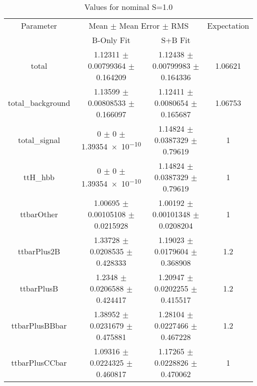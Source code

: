 \begin{table}
\centering
\caption{Values for nominal S=1.0}
\begin{tabular}{cccc}
\toprule
Parameter & \multicolumn{2}{c}{Mean $\pm$ Mean Error $\pm$ RMS} & Expectation\\
 & B-Only Fit & S+B Fit & \\
\midrule
total & \num{1.12311} $\pm$ \num{0.00799364} $\pm$ \num{0.164209} & \num{1.12438} $\pm$ \num{0.00799983} $\pm$ \num{0.164336} & \num{1.06621}\\
total\_background & \num{1.13599} $\pm$ \num{0.00808533} $\pm$ \num{0.166097} & \num{1.12411} $\pm$ \num{0.0080654} $\pm$ \num{0.165687} & \num{1.06753}\\
total\_signal & \num{0} $\pm$ \num{0} $\pm$ \num{1.39354e-10} & \num{1.14824} $\pm$ \num{0.0387329} $\pm$ \num{0.79619} & \num{1}\\
ttH\_hbb & \num{0} $\pm$ \num{0} $\pm$ \num{1.39354e-10} & \num{1.14824} $\pm$ \num{0.0387329} $\pm$ \num{0.79619} & \num{1}\\
ttbarOther & \num{1.00695} $\pm$ \num{0.00105108} $\pm$ \num{0.0215928} & \num{1.00192} $\pm$ \num{0.00101348} $\pm$ \num{0.0208204} & \num{1}\\
ttbarPlus2B & \num{1.33728} $\pm$ \num{0.0208535} $\pm$ \num{0.428333} & \num{1.19023} $\pm$ \num{0.0179604} $\pm$ \num{0.368908} & \num{1.2}\\
ttbarPlusB & \num{1.2348} $\pm$ \num{0.0206588} $\pm$ \num{0.424417} & \num{1.20947} $\pm$ \num{0.0202255} $\pm$ \num{0.415517} & \num{1.2}\\
ttbarPlusBBbar & \num{1.38952} $\pm$ \num{0.0231679} $\pm$ \num{0.475881} & \num{1.28104} $\pm$ \num{0.0227466} $\pm$ \num{0.467228} & \num{1.2}\\
ttbarPlusCCbar & \num{1.09316} $\pm$ \num{0.0224325} $\pm$ \num{0.460817} & \num{1.17265} $\pm$ \num{0.0228826} $\pm$ \num{0.470062} & \num{1}\\
\bottomrule
\end{tabular}
\end{table}